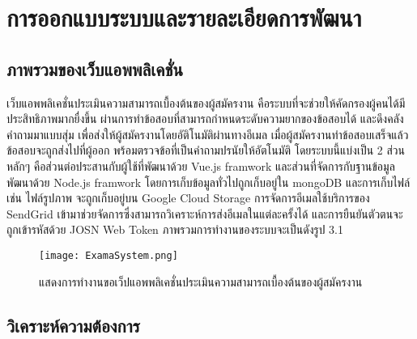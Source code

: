\chapter{การออกแบบระบบและรายละเอียดการพัฒนา}
\label{chapter:experiment}

\section{ภาพรวมของเว็บแอพพลิเคชั่น}

เว็บแอพพลิเคชั่นประเมินความสามารถเบื้องต้นของผู้สมัครงาน คือระบบที่จะช่วยให้คัดกรองผู้คนได้มีประสิทธิภาพมากยื่งขึ้น ผ่านการทำข้อสอบที่สามารถกำหนดระดับความยากของข้อสอบได้ และดึงคลังคำถามมาแบบสุ่ม เพื่อส่งให้ผู้สมัครงานโดยอัติโนมัติผ่านทางอีเมล เมื่อผู้สมัครงานทำข้อสอบเสร็จแล้ว ข้อสอบจะถูกส่งไปที่ผู้ออก พร้อมตรวจข้อที่เป็นคำถามปรนัยให้อัตโนมัติ โดยระบบนี้แบ่งเป็น 2 ส่วนหลักๆ คือส่วนต่อประสานกับผู้ใช้ที่พัฒนาด้วย Vue.js framwork และส่วนที่จัดการกับฐานข้อมูล พัฒนาด้วย Node.js framwork โดยการเก็บข้อมูลทั่วไปถูกเก็บอยู่ใน mongoDB และการเก็บไฟล์ เช่น ไฟล์รูปภาพ จะถูกเก็บอยู่บน Google Cloud Storage การจัดการอีเมลใช้บริการของ SendGrid เข้ามาช่วยจัดการซึ่งสามารถวิเคราะห์การส่งอีเมลในแต่ละครั้งได้ และการยืนยันตัวตนจะถูกเข้ารหัสด้วย JOSN Web Token ภาพรวมการทำงานของระบบจะเป็นดังรูป 3.1

\begin{figure}[H]
  \centering
  \texttt{[image: ExamaSystem.png]}
  \caption{แสดงการทำงานขอเว็ปแอพพลิเคชั่นประเมินความสามารถเบื้องต้นของผู้สมัครงาน}
  \label{Fig:ExamaSystem}
\end{figure}

\newpage
\section{วิเคราะห์ความต้องการ}

